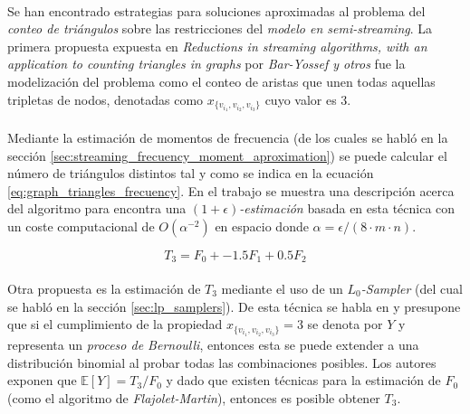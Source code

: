 \documentclass{subfiles}
\begin{document}
        \paragraph{}
        Se han encontrado estrategias para soluciones aproximadas al problema del \emph{conteo de triángulos} sobre las restricciones del \emph{modelo en semi-streaming}. La primera propuesta expuesta en \emph{Reductions in streaming algorithms, with an application to counting triangles in graphs} \cite{bar2002reductions} por \emph{Bar-Yossef y otros} fue la modelización del problema como el conteo de aristas que unen todas aquellas tripletas de nodos, denotadas como $x_{\{v_{i_1},v_{i_2},v_{i_3}\}}$ cuyo valor es $3$.

        \paragraph{}
        Mediante la estimación de momentos de frecuencia (de los cuales se habló en la sección \ref{sec:streaming_frecuency_moment_aproximation}) se puede calcular el número de triángulos distintos tal y como se indica en la ecuación \ref{eq:graph_triangles_frecuency}. En el trabajo \cite{bar2002reductions} se muestra una descripción acerca del algoritmo para encontra una \emph{$(1 + \epsilon)$-estimación} basada en esta técnica con un coste computacional de $O(\alpha^{-2})$ en espacio donde $\alpha = \epsilon / (8 \cdot m \cdot n)$.

        \begin{equation}
        \label{eq:graph_triangles_frecuency}
          T_3 = F_0 + -1.5F_1 + 0.5 F_2
        \end{equation}

        \paragraph{}
        Otra propuesta es la estimación de $T_3$ mediante el uso de un \emph{$L_0$-Sampler} (del cual se habló en la sección \ref{sec:lp_samplers}). De esta técnica se habla en \cite{ahn2012graph} y presupone que si el cumplimiento de la propiedad $x_{\{v_{i_1},v_{i_2},v_{i_3}\}} = 3$ se denota por $Y$ y representa un \emph{proceso de Bernoulli}, entonces esta se puede extender a una distribución binomial al probar todas las combinaciones posibles. Los autores exponen que $\mathbb{E}[Y] = T_3/F_0$ y dado que existen técnicas para la estimación de $F_0$ (como el algoritmo de \emph{Flajolet-Martin}), entonces es posible obtener $T_3$.
\end{document}

